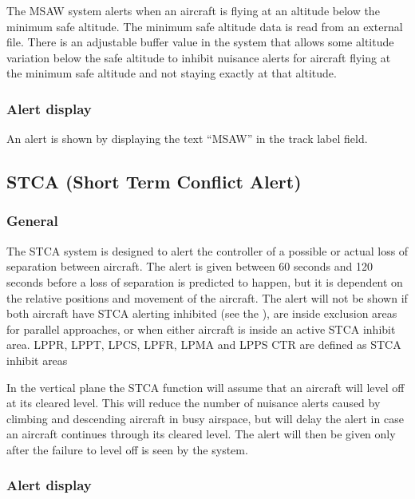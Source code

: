 \documentclass[a4paper,oneside,11pt]{memoir}
\begin{document}

The MSAW system alerts when an aircraft is flying at an altitude below the minimum safe altitude. The minimum safe altitude data is read from an external file. There is an adjustable buffer value in the system that allows some altitude variation below the safe altitude to inhibit nuisance alerts for aircraft flying at the minimum safe altitude and not staying exactly at that altitude.

\subsubsection*{Alert display}

An alert is shown by displaying the text “MSAW” in the  track label field.

\subsection{STCA (Short Term Conflict Alert)}
\label{tool:STCA}
\subsubsection*{General}

The STCA system is designed to alert the controller of a possible or actual loss of separation between aircraft. The alert is given between 60 seconds and 120 seconds before a loss of separation is predicted to happen, but it is dependent on the relative positions and movement of the aircraft. The alert will not be shown if both aircraft have STCA alerting inhibited (see the ), are inside exclusion areas for parallel approaches, or when either aircraft is inside an active STCA inhibit area. LPPR, LPPT, LPCS, LPFR, LPMA and LPPS CTR are defined as STCA inhibit areas

\bigskip

In the vertical plane the STCA function will assume that an aircraft will level off at its cleared level. This will reduce the number of nuisance alerts caused by climbing and descending aircraft in busy airspace, but will delay the alert in case an aircraft continues through its cleared level. The alert will then be given only after the failure to level off is seen by the system.

\subsubsection*{Alert display}
\end{document}
